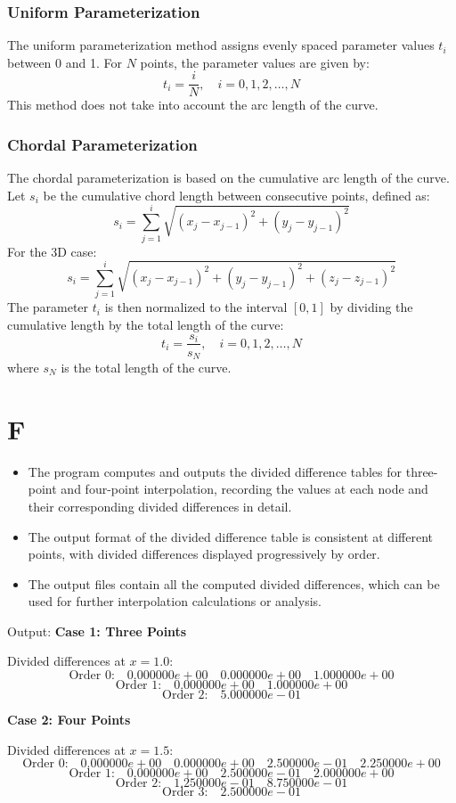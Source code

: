 \documentclass[a4paper]{article}
\begin{document}
\subsubsection{Uniform Parameterization}

The uniform parameterization method assigns evenly spaced parameter values \( t_i \) between 0 and 1. For \( N \) points, the parameter values are given by:
\[
t_i = \frac{i}{N}, \quad i = 0, 1, 2, \dots, N
\]
This method does not take into account the arc length of the curve.

\subsubsection{Chordal Parameterization}

The chordal parameterization is based on the cumulative arc length of the curve. Let \( s_i \) be the cumulative chord length between consecutive points, defined as:
\[
s_i = \sum_{j=1}^{i} \sqrt{(x_j - x_{j-1})^2 + (y_j - y_{j-1})^2}
\]
For the 3D case:
\[
s_i = \sum_{j=1}^{i} \sqrt{(x_j - x_{j-1})^2 + (y_j - y_{j-1})^2 + (z_j - z_{j-1})^2}
\]
The parameter \( t_i \) is then normalized to the interval \( [0, 1] \) by dividing the cumulative length by the total length of the curve:
\[
t_i = \frac{s_i}{s_N}, \quad i = 0, 1, 2, \dots, N
\]
where \( s_N \) is the total length of the curve.

\section*{F}

\begin{itemize}
    \item The program computes and outputs the divided difference tables for three-point and four-point interpolation, recording the values at each node and their corresponding divided differences in detail.
    \item The output format of the divided difference table is consistent at different points, with divided differences displayed progressively by order.
    \item The output files contain all the computed divided differences, which can be used for further interpolation calculations or analysis.
\end{itemize}

Output:
\textbf{Case 1: Three Points}

Divided differences at \( x = 1.0 \):
\[
\text{Order 0:} \quad 0.000000e+00 \quad 0.000000e+00 \quad 1.000000e+00
\]
\[
\text{Order 1:} \quad 0.000000e+00 \quad 1.000000e+00
\]
\[
\text{Order 2:} \quad 5.000000e-01
\]

\textbf{Case 2: Four Points}

Divided differences at \( x = 1.5 \):
\[
\text{Order 0:} \quad 0.000000e+00 \quad 0.000000e+00 \quad 2.500000e-01 \quad 2.250000e+00
\]
\[
\text{Order 1:} \quad 0.000000e+00 \quad 2.500000e-01 \quad 2.000000e+00
\]
\[
\text{Order 2:} \quad 1.250000e-01 \quad 8.750000e-01
\]
\[
\text{Order 3:} \quad 2.500000e-01
\]
\end{document}
